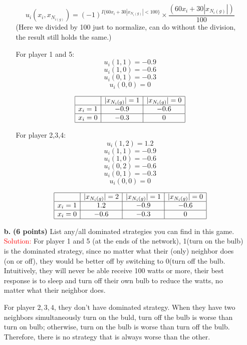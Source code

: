 \documentclass[11pt]{article} %
\begin{document}
\begin{itemize}
\begin{itemize}
$$u_i(x_i, x_{N_{i(g)}})=  (-1)^{I\{60 x_i+ 30 |x_{N_i(g)}|<100\}} \times \frac{(60 x_i+ 30 |x_{N_i(g)}|)}{100} $$
(Here we divided by 100 just to normalize, can do without the division, the result still holds the same.)

	\subitem For player 1 and 5: 
	$$u_i(1, 1)=-0.9$$
	$$u_i(1, 0)=-0.6$$
	$$u_i(0, 1)=-0.3$$
	$$u_i(0, 0)=0$$

$$\begin{array} {|c|c|c|c|} \hline
& \text{$|x_{N_i(g)}|=1$} & \text{$|x_{N_i(g)}|=0$}\\ \hline
\text{$x_i=1$} & -0.9 & -0.6   \\ \hline
\text{$x_i=0$} & -0.3 & 0   \\ \hline
\end{array}$$		

	\subitem For player 2,3,4: 
	$$u_i(1, 2)=1.2$$
	$$u_i(1, 1)=-0.9$$
           $$u_i(1, 0)=-0.6$$
	$$u_i(0, 2)= -0.6$$
	$$u_i(0, 1)=-0.3$$
           $$u_i(0, 0)=0$$

$$\begin{array} {|c|c|c|c|} \hline
& \text{$|x_{N_i(g)}|=2$} & \text{$|x_{N_i(g)}|=1$} & \text{$|x_{N_i(g)}|=0$}\\ \hline
\text{$x_i=1$} & 1.2 & -0.9 & -0.6   \\ \hline
\text{$x_i=0$} & -0.6 & -0.3 & 0   \\ \hline
\end{array}$$	

\end{itemize}

\item[\textbf{b.}] \textbf{(6 points)}  List any/all dominated strategies you can find in this game. \\

\textcolor{red}{Solution:}
For player 1 and 5 (at the ends of the network), 1(turn on the bulb) is the dominated strategy, since no matter what their (only) neighbor does (on or off), they would be better off by switching to 0(turn off the bulb. Intuitively, they will never be able receive 100 watts or more, their best response is to sleep and turn off their own bulb to reduce the watts, no matter what their neighbor does. 

For player ${2,3,4}$, they don't have dominated strategy. When they have two neighbors simultaneously turn on the buld, turn off the bulb is worse than turn on bulb; otherwise, turn on the bulb is worse than turn off the bulb. Therefore, there is no strategy that is always worse than the other. 




\end{itemize}
\end{document}
